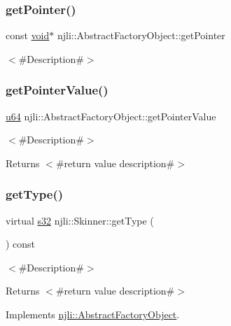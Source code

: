 \subsubsection{\texorpdfstring{get\+Pointer()}{getPointer()}}
{\footnotesize\ttfamily const \mbox{\hyperlink{_thread_8h_af1e856da2e658414cb2456cb6f7ebc66}{void}}$\ast$ njli\+::\+Abstract\+Factory\+Object\+::get\+Pointer}

$<$\#\+Description\#$>$ \mbox{\label{classnjli_1_1_skinner_a4ffddf141a426a5a07d0ac19f1913811}} 
\subsubsection{\texorpdfstring{get\+Pointer\+Value()}{getPointerValue()}}
{\footnotesize\ttfamily \mbox{\hyperlink{_util_8h_ad758b7a5c3f18ed79d2fcd23d9f16357}{u64}} njli\+::\+Abstract\+Factory\+Object\+::get\+Pointer\+Value}

$<$\#\+Description\#$>$

\begin{DoxyReturn}{Returns}
$<$\#return value description\#$>$ 
\end{DoxyReturn}
\mbox{\label{classnjli_1_1_skinner_a797a6a7f87d2bdb108bd23789bf54a79}} 
\subsubsection{\texorpdfstring{get\+Type()}{getType()}}
{\footnotesize\ttfamily virtual \mbox{\hyperlink{_util_8h_aa62c75d314a0d1f37f79c4b73b2292e2}{s32}} njli\+::\+Skinner\+::get\+Type (\begin{DoxyParamCaption}{ }\end{DoxyParamCaption}) const\hspace{0.3cm}{\ttfamily [virtual]}}

$<$\#\+Description\#$>$

\begin{DoxyReturn}{Returns}
$<$\#return value description\#$>$ 
\end{DoxyReturn}


Implements \mbox{\hyperlink{classnjli_1_1_abstract_factory_object_a207c86146d40d0794708ae7f2d4e60a7}{njli\+::\+Abstract\+Factory\+Object}}.

